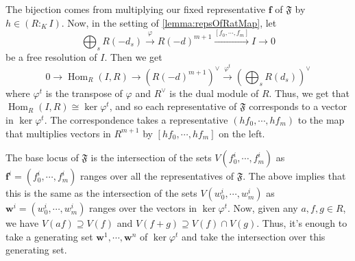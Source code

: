 \documentclass[11pt]{amsart}
\numberwithin{equation}{theorem}
\renewcommand{\:}{\colon}
\DeclareMathOperator{\homgp}{Hom}
\theoremstyle{theorem}
\begin{document}
The bijection comes from multiplying our fixed representative $\textbf{f}$ of $\mathfrak{F}$ by $h \in (R :_K I)$.
Now, in the setting of \autoref{lemma:repsOfRatMap}, let
  \[
    \bigoplus_s R(-d_s) \xrightarrow{\varphi} R(-d)^{m+1} \xrightarrow{[f_0, \cdots, f_m]} I \to 0
  \]
be a free resolution of $I$. Then we get
\[
  0 \to \homgp_R(I, R) \to \left( R(-d)^{m+1} \right)^\vee \xrightarrow{\varphi^t} \left( \bigoplus_s R(d_s) \right)^\vee
\]
where $\varphi^t$ is the transpose of $\varphi$ and $R^\vee$ is the dual module of $R$. Thus, we get that $\homgp_R(I,R) \cong \ker \varphi^t$, and so each representative of $\mathfrak{F}$ corresponds to a vector in $\ker \varphi^t$. The correspondence takes a representative $(hf_0, \cdots, hf_m)$ to the map that multiplies vectors in $R^{m+1}$ by $[hf_0, \cdots, hf_m]$ on the left.

The base locus of $\mathfrak{F}$ is the intersection of the sets $V(f^i_0, \cdots, f^i_m)$ as $\mathbf{f}^i = (f^i_0, \cdots, f^i_m)$ ranges over all the representatives of $\mathfrak{F}$. The above implies that this is the same as the intersection of the sets $V(w^i_0,\cdots, w^i_m)$ as $\mathbf{w}^i = (w^i_0, \cdots, w^i_m)$ ranges over the vectors in $\ker \varphi^t$. Now, given any $a, f, g\in R$, we have $V(af) \supseteq V(f)$ and $V(f + g) \supseteq V(f)\cap V(g)$. Thus, it's enough to take a generating set $\mathbf w^1, \cdots, \mathbf w^n$ of $\ker \varphi^t$  and take the intersection over this generating set.
\end{document}
